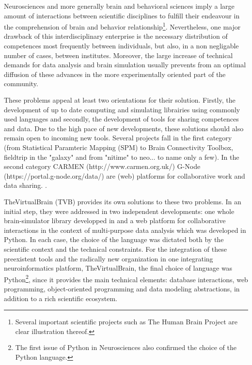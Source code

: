 Neurosciences and more generally brain and behavioral sciences imply a large
amount of interactions between scientific disciplines to fulfill their endeavour
in the comprehension of brain and behavior relationship\footnote{Several
    important scientific projects such as The Human Brain Project are clear
illustration thereof.}. Nevertheless, one major drawback of this
interdisciplinary enterprise is the necessary distribution of competences most
frequently between individuals, but also, in a non negligable number of cases,
between institutes.  Moreover, the large increase of technical demands for data
analysis and brain simulation usually prevents from an optimal diffusion of these
advances in the more experimentally oriented part of the community. 

These problems appeal at least two orientations for their solution. Firstly,  the
development of up to date computing and simulating librairies using commonly
used languages and secondly, the development of tools for sharing
competences and data. Due to the high pace of new developments, these solutions
should also remain open to incoming new tools. Several projects fall in the
first category (from Statistical Paramteric Mapping (SPM) to Brain Connectivity Toolbox, fieldtrip in the \matlab{} "galaxy"
and from "nitime" to neo... to name only a few). In the second category CARMEN
(http://www.carmen.org.uk/) G-Node (https://portal.g-node.org/data/)
 are (web) platforms for collaborative work and data
sharing. .

TheVirtualBrain (TVB) provides its own solutions to these two problems.  In an
initial step, they were addressed in two independent developments: one whole
brain-simulator library developped in \matlab{} and a web platform for
collaborative interactions in the context of multi-purpose data analysis which
was developed in Python.  In each case, the choice of the language was dictated
both by the scientific context and the technical constraints. For the
integration of these preexistent tools and the radically new organization in
one integrating neuroinformatics platform, TheVirtualBrain, the final choice of
language was Python\footnote{The first issue of Python in Neurosciences also
confirmed the choice of the Python language.}, since it provides the main
technical elements: database interactions, web programming, object-oriented
programming and data modeling abstractions, in addition to a rich scientific
ecosystem.

